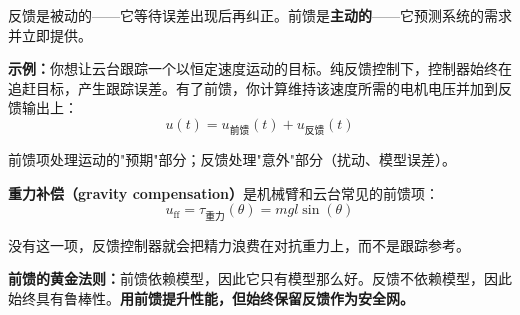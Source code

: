 反馈是被动的——它等待误差出现后再纠正。前馈是\textbf{主动的}——它预测系统的需求并立即提供。

\textbf{示例：}你想让云台跟踪一个以恒定速度运动的目标。纯反馈控制下，控制器始终在追赶目标，产生跟踪误差。有了前馈，你计算维持该速度所需的电机电压并加到反馈输出上：
\begin{equation}
u(t) = u_{\text{前馈}}(t) + u_{\text{反馈}}(t)
\end{equation}

前馈项处理运动的"预期"部分；反馈处理"意外"部分（扰动、模型误差）。

\textbf{重力补偿（gravity compensation）}是机械臂和云台常见的前馈项：
\begin{equation}
u_{\text{ff}} = \tau_{\text{重力}}(\theta) = mgl\sin(\theta)
\end{equation}

没有这一项，反馈控制器就会把精力浪费在对抗重力上，而不是跟踪参考。

\textbf{前馈的黄金法则：}前馈依赖模型，因此它只有模型那么好。反馈不依赖模型，因此始终具有鲁棒性。\textbf{用前馈提升性能，但始终保留反馈作为安全网。}


